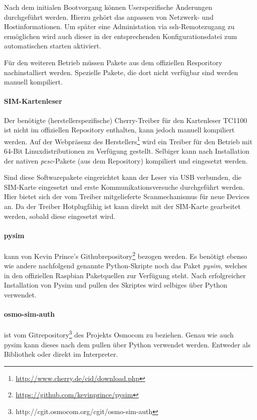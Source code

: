             Nach dem initialen Bootvorgang können Userspezifische Änderungen durchgeführt werden. Hierzu
            gehört das anpassen von Netzwerk- und Hostinformationen. Um später eine Administation via
            \ac{ssh}-Remotezugang zu ermöglichen wird auch dieser in der entsprechenden Konfigurationsdatei
            zum automatischen starten aktiviert.

            Für den weiteren Betrieb müssen Pakete aus dem offiziellen Resporitory
            nachinstalliert werden. Spezielle Pakete, die dort nicht verfügbar sind werden
            manuell kompiliert.

            \paragraph{SIM-Kartenleser} Der benötigte (herstellerspezifische)
            Cherry-Treiber für den Kartenleser TC1100 ist nicht im offiziellen Repository enthalten, kann jedoch
            manuell kompiliert werden. Auf der Webpräsenz des Herstellers\footnote{\url{http://www.cherry.de/cid/download.php}}
            wird ein Treiber für den Betrieb mit 64-Bit Linuxdistributionen zu Verfügung gestellt.
            Selbiger kann nach Installation der nativen \textit{pcsc}-Pakete (aus dem Repository)
            kompiliert und eingesetzt werden.

            Sind diese Softwarepakete eingerichtet kann der Leser via USB verbunden, die SIM-Karte eingesetzt
            und erste Kommunikationsversuche durchgeführt werden. Hier bietet sich der vom
            Treiber mitgelieferte Scanmechanismus für neue Devices an. Da der Treiber
            Hotplugfähig ist kann direkt mit der SIM-Karte gearbeitet werden, sobald diese
            eingesetzt wird.

			\paragraph{pysim} kann von Kevin Prince's Githubrepository\footnote{\url{https://github.com/kevinprince/pysim}} bezogen werden. Es benötigt ebenso
            wie andere nachfolgend genannte Python-Skripte noch das Paket \textit{pysim}, welches
            in den offiziellen Raspbian Paketquellen zur Verfügung steht. Nach erfolgreicher Installation
            von Pysim und pullen des Skriptes wird selbiges über Python verwendet.

            \paragraph{osmo-sim-auth} ist vom Gitrepository\footnote{\url{}http://cgit.osmocom.org/cgit/osmo-sim-auth} des Projekts Osmocom zu  beziehen. Genau wie auch pysim kann dieses nach dem pullen
            über Python verwendet werden. Entweder als Bibliothek oder direkt im Interpreter.

